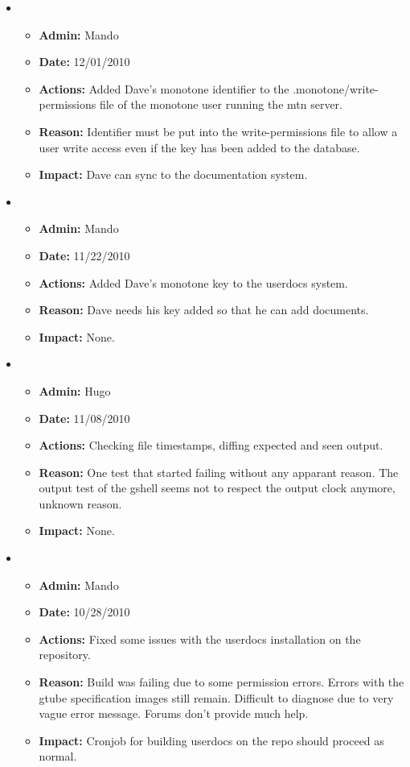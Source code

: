 \documentclass[12pt]{article}
\begin{document}
\begin{itemize}

\item
\begin{itemize}
\item[] {\bf Admin:} Mando
\item[] {\bf Date:} 12/01/2010 
\item[] {\bf Actions:} Added Dave's monotone identifier to the .monotone/write-permissions file of the monotone user running the mtn server.
\item[] {\bf Reason:} Identifier must be put into the write-permissions file to allow a user write access even if the key has been added to the database.
\item[] {\bf Impact:} Dave can sync to the documentation system.
\end{itemize}
	
\item
\begin{itemize}
\item[] {\bf Admin:} Mando
\item[] {\bf Date:} 11/22/2010 
\item[] {\bf Actions:} Added Dave's monotone key to the userdocs system.
\item[] {\bf Reason:} Dave needs his key added so that he can add documents.
\item[] {\bf Impact:} None.
\end{itemize}
	
\item
\begin{itemize}
\item[] {\bf Admin:} Hugo
\item[] {\bf Date:} 11/08/2010 
\item[] {\bf Actions:} Checking file timestamps, diffing expected and seen output.
\item[] {\bf Reason:} One test that started failing without any
  apparant reason.  The output test of the gshell seems not to respect
  the output clock anymore, unknown reason.
\item[] {\bf Impact:} None.
\end{itemize}	

\item
\begin{itemize}
\item[] {\bf Admin:} Mando
\item[] {\bf Date:} 10/28/2010 
\item[] {\bf Actions:} Fixed some issues with the userdocs installation on the repository. 
\item[] {\bf Reason:} Build was failing due to some permission errors. Errors with the gtube specification images still remain. Difficult to diagnose due to very vague error message. Forums don't provide much help.
\item[] {\bf Impact:} Cronjob for building userdocs on the repo should proceed as normal.
\end{itemize}	


\end{itemize}
\end{document}
